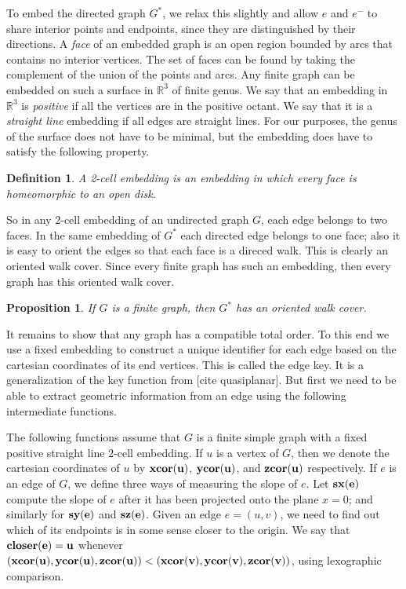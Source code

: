 \documentclass[11pt]{article}
\newcommand{\closer}{\bf closer}
\newcommand{\xcor}{\bf xcor}
\newcommand{\ycor}{\bf ycor}
\newcommand{\zcor}{\bf zcor}
\newcommand{\sx}{\bf sx}
\newcommand{\sy}{\bf sy}
\newcommand{\sz}{\bf sz}
\newtheorem{definition}[theorem]{Definition}
\newtheorem{proposition}[theorem]{Proposition}
\begin{document}
To embed the directed graph $G^*$, we relax this slightly and allow $e$ and $e^-$ to share interior points and 
endpoints, since they are distinguished by their directions.  
A \emph{face} of an embedded graph is an open region bounded by arcs that contains no interior vertices.  The 
set of faces can be found by taking the complement of the union of the points and arcs.
Any finite graph can be embedded on such a surface in $\mathbb{R}^3$ of finite genus.  We 
say that an embedding in $\mathbb{R}^3$ is \emph{positive} if all the vertices are in the positive octant.  
We say that it is a \emph{straight line} embedding if all edges are straight lines.
For our purposes, 
the genus of the surface does not have to be minimal,
 but the embedding does have to satisfy the following property.

\begin{definition}
A \emph{2-cell embedding} is an embedding in which every face is homeomorphic to an open disk.
\end{definition}

So in any $2$-cell embedding of an undirected graph $G$, each edge belongs to two faces.  In 
the same embedding of $G^*$ each directed edge belongs to one face; also it is easy to orient 
the edges so that each face is a direced walk.  This is clearly an oriented walk cover.  Since every 
finite graph has such an embedding, then every graph has this oriented walk cover.

\begin{proposition}
If $G$ is a finite graph, then $G^*$ has an oriented walk cover.
\end{proposition}

It remains to show that any graph has a compatible total order.  To this end we use 
a fixed embedding to construct 
a unique identifier for each edge based on the cartesian coordinates of its 
end vertices.  This is called the edge key.  It is a generalization of the 
key function from [cite quasiplanar].  But first we need to be able to 
extract geometric information from an edge using the following intermediate functions.

The following functions assume that $G$ is a finite simple graph with a fixed 
positive straight line $2$-cell 
embedding.  If $u$ is a vertex of $G$, then we denote the cartesian coordinates of 
$u$ by $\xcor(u)$, $\ycor(u)$, and $\zcor(u)$ respectively.  If $e$ is an 
edge of $G$, we define three ways of measuring the slope of $e$.  Let $\sx(e)$ 
compute the slope of $e$ after it has been projected onto the plane $x=0$; and similarly 
for $\sy(e)$ and $\sz(e)$.  Given an edge $e=(u,v)$, we need to find out which of its 
endpoints is in some sense closer to the origin.  We say that $\closer(e)=u$ whenever 
$(\xcor(u),\ycor(u),\zcor(u)) < (\xcor(v),\ycor(v),\zcor(v))$, using lexographic comparison.  
\end{document}

